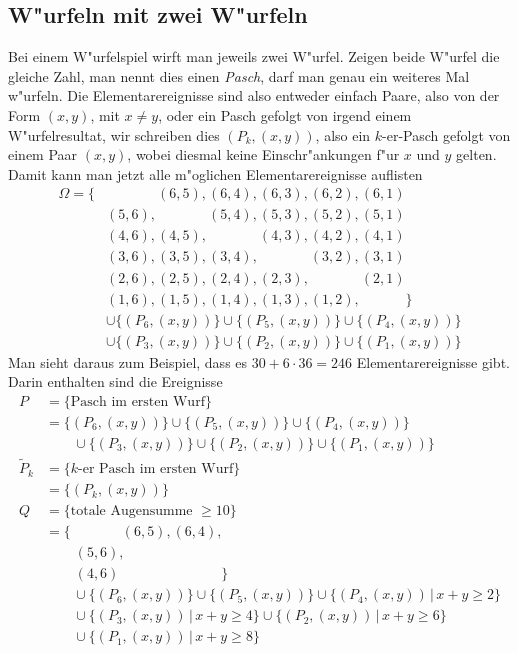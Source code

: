 \subsection{W"urfeln mit zwei W"urfeln}
Bei einem W"urfelspiel wirft man jeweils zwei W"urfel.
Zeigen beide W"urfel
die gleiche Zahl, man nennt dies einen {\em Pasch}, darf man genau ein
weiteres Mal w"urfeln.
Die Elementarereignisse sind also entweder einfach Paare, also von
der Form $(x,y)$, mit $x\ne y$, oder ein Pasch gefolgt von irgend einem
W"urfelresultat, wir schreiben dies $(P_k, (x,y))$, also ein $k$-er-Pasch
gefolgt von einem Paar $(x,y)$, wobei diesmal keine Einschr"ankungen f"ur
$x$ und $y$ gelten.
Damit kann man jetzt alle m"oglichen Elementarereignisse auflisten
\begin{align*}
\Omega=\{
&\phantom{(6,6),} (6,5), (6,4), (6,3), (6,2), (6,1)\\
&(5,6), \phantom{(5,5),} (5,4), (5,3), (5,2), (5,1)\\
&(4,6), (4,5), \phantom{(4,4),} (4,3), (4,2), (4,1)\\
&(3,6), (3,5), (3,4), \phantom{(3,3),} (3,2), (3,1)\\
&(2,6), (2,5), (2,4), (2,3), \phantom{(2,2),} (2,1)\\
&(1,6), (1,5), (1,4), (1,3), (1,2), \phantom{(1,1)}
\}
\\
&\cup
\{(P_6,(x,y))\}
\cup
\{(P_5,(x,y))\}
\cup
\{(P_4,(x,y))\}
\\
&\cup
\{(P_3,(x,y))\}
\cup
\{(P_2,(x,y))\}
\cup
\{(P_1,(x,y))\}
\end{align*}
Man sieht daraus zum Beispiel, dass es $30 + 6\cdot 36=246$
Elementarereignisse gibt.
Darin enthalten sind die Ereignisse
\begin{align*}
P&=\{\text{Pasch im ersten Wurf}\}\\
&=
\{(P_6,(x,y))\}
\cup
\{(P_5,(x,y))\}
\cup
\{(P_4,(x,y))\}
\\
&\qquad \cup
\{(P_3,(x,y))\}
\cup
\{(P_2,(x,y))\}
\cup
\{(P_1,(x,y))\}
\\
\tilde P_k&=\{\text{$k$-er Pasch im ersten Wurf}\}\\
   &=\{(P_k,(x,y))\}
\\
Q&=\{\text{totale Augensumme $\ge 10$}\}\\
&=\{\phantom{(6,6),} (6,5), (6,4), \\
&\phantom{\;=\{}(5,6), \phantom{(5,5), (5,4)} \\
&\phantom{\;=\{}(4,6)\phantom{, (4,5), (4,4)}
\}
\\
&\qquad\cup
\{(P_6,(x,y))\}
\cup
\{(P_5,(x,y))\}
\cup
\{(P_4,(x,y))\,|\, x+y \ge 2\}
\\
&\qquad\cup
\{(P_3,(x,y))\,|\, x+y \ge 4\}
\cup
\{(P_2,(x,y))\,|\, x+y \ge 6\}
\\
&\qquad
\cup
\{(P_1,(x,y))\,|\, x+y \ge 8\}
\end{align*}

